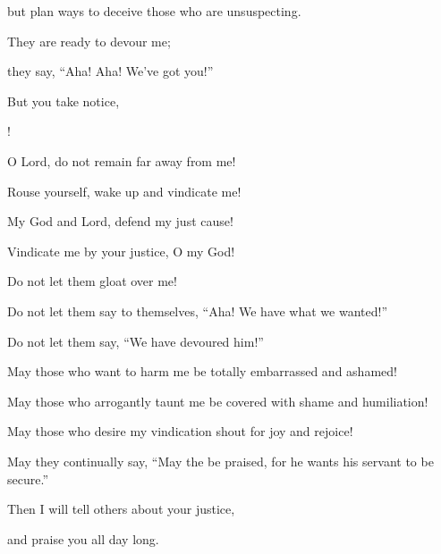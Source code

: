 {\par }{\Q but plan
ways
to deceive
those who are unsuspecting.
\par }{\Q {}They are ready
to devour
me;

\par }{\Q they say,
“Aha! Aha! We’ve got you!”
\par }{\Q {}But you take notice,

{}!
\par }{\Q O Lord,
do not
remain far
away from me!
\par }{\Q {}Rouse
yourself, wake
up and vindicate
me!

\par }{\Q My God
and Lord,
defend my just cause!
\par }{\Q {}Vindicate
me by your justice,
O
{}
my God!
\par }{\Q Do not
let them gloat over me!
\par }{\Q {}Do not
let them say
to themselves, “Aha! We have what we wanted!”

\par }{\Q Do not
let them say,
“We have devoured him!”
\par }{\Q {}May those who want to harm
me be totally
embarrassed
and ashamed!

\par }{\Q May those who arrogantly
taunt
me be covered with shame
and humiliation!
\par }{\Q {}May those who desire
my vindication
shout for joy
and rejoice!
\par }{\Q May they continually
say, “May the
{}
be praised,
for he wants
his servant
to be secure.”
\par }{\Q {}Then
I will tell others
about your justice,
\par }{\Q and praise
you all
day long.


}
